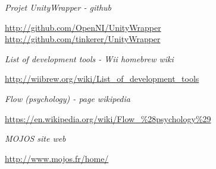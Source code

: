 \begin{thebibliography}{9}
  \emph{Projet UnityWrapper - github}\\
  \begin{small}
  \url{http://github.com/OpenNI/UnityWrapper}\\
  \url{http://github.com/tinkerer/UnityWrapper}
  \end{small}
  
  \emph{List of development tools - Wii homebrew wiki}\\
  \begin{small}
  \url{http://wiibrew.org/wiki/List_of_development_tools}
  \end{small}
  
  \emph{Flow (psychology) - page wikipedia}\\
  \begin{small}
  \url{https://en.wikipedia.org/wiki/Flow_\%28psychology\%29}
  \end{small}
  
  \emph{MOJOS site web}\\
  \begin{small}
  \url{http://www.mojos.fr/home/}
  \end{small}
  
\end{thebibliography}
        
